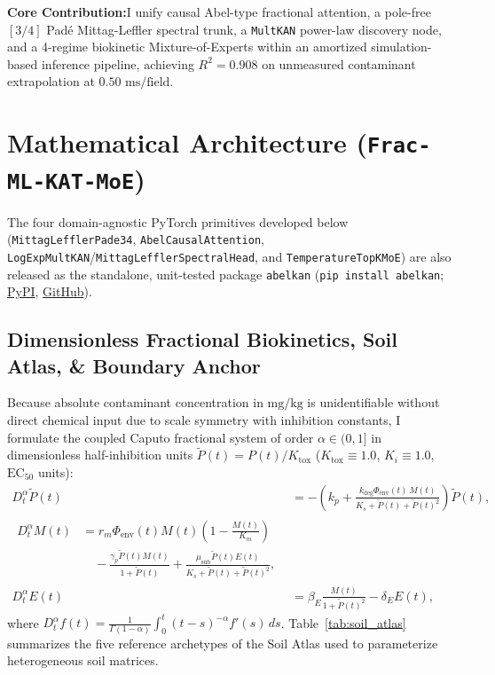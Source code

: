 \documentclass[10pt,twocolumn,a4paper]{article}
\newcommand{\takeaway}[2]{%
  \vspace{4pt}\noindent\colorbox{primary!7}{%
    \parbox{\dimexpr\linewidth-2\fboxsep\relax}{%
      \vspace{2pt}\footnotesize\textbf{\color{primary}#1:}\hspace{0.4em}#2\vspace{2pt}%
    }%
  }\vspace{4pt}%
}
\begin{document}
\takeaway{Core Contribution}{I unify causal Abel-type fractional attention, a pole-free $[3/4]$ Pad\'e Mittag-Leffler spectral trunk, a \texttt{MultKAN} power-law discovery node, and a 4-regime biokinetic Mixture-of-Experts within an amortized simulation-based inference pipeline, achieving $R^2 = 0.908$ on unmeasured contaminant extrapolation at $0.50\text{ ms/field}$.}

\section{Mathematical Architecture (\texttt{Frac-ML-KAT-MoE})}

The four domain-agnostic PyTorch primitives developed below (\texttt{MittagLefflerPade34}, \texttt{AbelCausalAttention}, \texttt{LogExpMultKAN}/\texttt{MittagLefflerSpectralHead}, and \texttt{TemperatureTopKMoE}) are also released as the standalone, unit-tested package \texttt{abelkan} (\texttt{pip install abelkan}; \href{https://pypi.org/project/abelkan/}{PyPI}, \href{https://github.com/Lolycut/abelkan}{GitHub}).

\subsection{Dimensionless Fractional Biokinetics, Soil Atlas, \& Boundary Anchor}

Because absolute contaminant concentration in $\text{mg/kg}$ is unidentifiable without direct chemical input due to scale symmetry with inhibition constants, I formulate the coupled Caputo fractional system of order $\alpha \in (0, 1]$ in dimensionless half-inhibition units $\tilde{P}(t) = P(t)/K_{\text{tox}}$ ($K_{\text{tox}} \equiv 1.0$, $K_i \equiv 1.0$, $\text{EC}_{50}$ units):
\begin{align}
  D_t^\alpha \tilde{P}(t) &= -\!\left(k_p + \frac{k_{\text{deg}}\Phi_{\text{env}}(t)\,M(t)}{K_s + \tilde{P}(t) + \tilde{P}(t)^2}\right)\!\tilde{P}(t), \label{eq:caputo_p} \\
  \begin{split}
    D_t^\alpha M(t) &= r_m\Phi_{\text{env}}(t)M(t)\!\left(\!1 - \frac{M(t)}{K_m}\!\right) \\
    &\quad - \frac{\gamma_p\tilde{P}(t)M(t)}{1 + \tilde{P}(t)} + \frac{\mu_{\text{sub}}\tilde{P}(t)E(t)}{K_s + \tilde{P}(t) + \tilde{P}(t)^2},
  \end{split} \label{eq:caputo_m} \\
  D_t^\alpha E(t) &= \beta_E \frac{M(t)}{1 + \tilde{P}(t)^2} - \delta_E E(t), \label{eq:caputo_e}
\end{align}
where $D_t^\alpha f(t) = \frac{1}{\Gamma(1-\alpha)}\int_0^t (t-s)^{-\alpha}f'(s)\,ds$. Table~\ref{tab:soil_atlas} summarizes the five reference archetypes of the Soil Atlas used to parameterize heterogeneous soil matrices.
\end{document}
